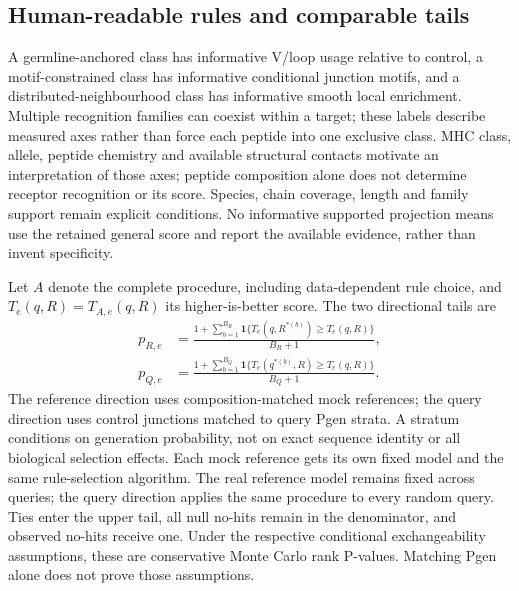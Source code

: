\documentclass[10pt,a4paper]{article}
\theoremstyle{definition}
\begin{document}
\subsection{Human-readable rules and comparable tails}
A germline-anchored class has informative V/loop usage relative to control, a motif-constrained class has informative conditional junction motifs, and a distributed-neighbourhood class has informative smooth local enrichment.
Multiple recognition families can coexist within a target; these labels describe measured axes rather than force each peptide into one exclusive class.
MHC class, allele, peptide chemistry and available structural contacts motivate an interpretation of those axes; peptide composition alone does not determine receptor recognition or its score.
Species, chain coverage, length and family support remain explicit conditions.
No informative supported projection means use the retained general score and report the available evidence, rather than invent specificity.

Let $A$ denote the complete procedure, including data-dependent rule choice, and $T_e(q,R)=T_{A,e}(q,R)$ its higher-is-better score.
The two directional tails are
\begin{align}
 p_{R,e}&=\frac{1+\sum_{b=1}^{B_R}\mathbf1\{T_e(q,R^{*(b)})\ge T_e(q,R)\}}{B_R+1},\nonumber\\
 p_{Q,e}&=\frac{1+\sum_{b=1}^{B_Q}\mathbf1\{T_e(q^{*(b)},R)\ge T_e(q,R)\}}{B_Q+1}.
 \label{eq:selection-tails}
\end{align}
The reference direction uses composition-matched mock references; the query direction uses control junctions matched to query Pgen strata.
A stratum conditions on generation probability, not on exact sequence identity or all biological selection effects.
Each mock reference gets its own fixed model and the same rule-selection algorithm.
The real reference model remains fixed across queries; the query direction applies the same procedure to every random query.
Ties enter the upper tail, all null no-hits remain in the denominator, and observed no-hits receive one.
Under the respective conditional exchangeability assumptions, these are conservative Monte Carlo rank P-values.
Matching Pgen alone does not prove those assumptions.
\end{document}
